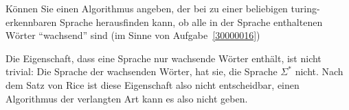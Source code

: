 Können Sie einen Algorithmus angeben, der bei zu einer beliebigen
turing-erkennbaren
Sprache herausfinden kann, ob alle in der Sprache enthaltenen Wörter
``wachsend'' sind (im Sinne von Aufgabe~\ref{30000016})

\begin{loesung}
Die Eigenschaft, dass eine Sprache nur wachsende Wörter
enthält, ist nicht trivial: Die Sprache der wachsenden
Wörter, hat sie, die Sprache $\Sigma^*$ nicht. Nach dem
Satz von Rice ist diese Eigenschaft also nicht entscheidbar,
einen Algorithmus der verlangten Art kann es also nicht geben.
\end{loesung}

